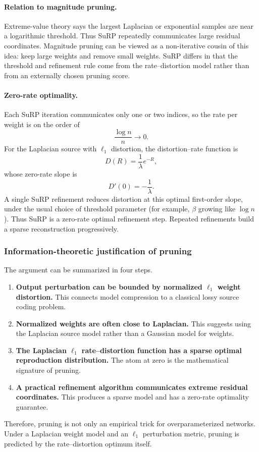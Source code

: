 \paragraph{Relation to magnitude pruning.}
Extreme-value theory says the largest Laplacian or exponential samples are near a logarithmic threshold.
Thus SuRP repeatedly communicates large residual coordinates.
Magnitude pruning can be viewed as a non-iterative cousin of this idea: keep large weights and remove small weights.
SuRP differs in that the threshold and refinement rule come from the rate--distortion model rather than from an externally chosen pruning score.

\paragraph{Zero-rate optimality.}
Each SuRP iteration communicates only one or two indices, so the rate per weight is on the order of
\[
    \frac{\log n}{n}\to 0.
\]
For the Laplacian source with $\ell_1$ distortion, the distortion--rate function is
\[
    D(R)=\frac1\lambda e^{-R},
\]
whose zero-rate slope is
\[
    D'(0)=-\frac1\lambda.
\]
A single SuRP refinement reduces distortion at this optimal first-order slope, under the usual choice of threshold parameter (for example, $\beta$ growing like $\log n$).
Thus SuRP is a zero-rate optimal refinement step.
Repeated refinements build a sparse reconstruction progressively.

\subsubsection*{Information-theoretic justification of pruning}

The argument can be summarized in four steps.
\begin{enumerate}[leftmargin=2em]
    \item \textbf{Output perturbation can be bounded by normalized $\ell_1$ weight distortion.}
    This connects model compression to a classical lossy source coding problem.

    \item \textbf{Normalized weights are often close to Laplacian.}
    This suggests using the Laplacian source model rather than a Gaussian model for weights.

    \item \textbf{The Laplacian $\ell_1$ rate--distortion function has a sparse optimal reproduction distribution.}
    The atom at zero is the mathematical signature of pruning.

    \item \textbf{A practical refinement algorithm communicates extreme residual coordinates.}
    This produces a sparse model and has a zero-rate optimality guarantee.
\end{enumerate}
Therefore, pruning is not only an empirical trick for overparameterized networks.
Under a Laplacian weight model and an $\ell_1$ perturbation metric, pruning is predicted by the rate--distortion optimum itself.

